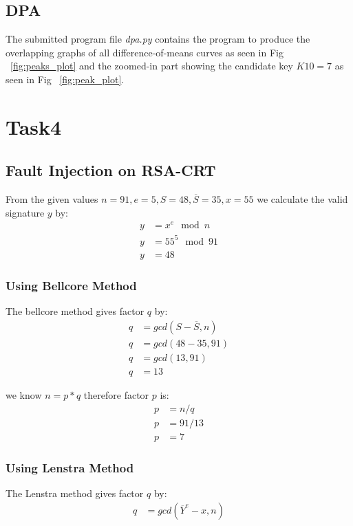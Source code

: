 \documentclass[1p,16pt]{elsarticle}
\begin{document}
\subsection{DPA}%
\label{sub:dpa}
The submitted program file \textit{dpa.py} contains the program to produce the overlapping graphs
of all difference-of-means curves as seen in Fig ~\ref{fig:peaks_plot} and the zoomed-in part
showing the candidate key $K10=7$ as seen in Fig ~\ref{fig:peak_plot}.



\section{Task4}
\label{Task4}
\subsection{Fault Injection on RSA-CRT}%
\label{sub:fault_injection_on_rsa_crt}
From the given values
$n=91, e=5, S=48, \overline{S}=35, x=55$
we calculate the valid signature $y$ by:
\begin{align}
	y &= x^e \mod n \\
	y &= 55^5 \mod 91 \\
	y & = 48
\end{align}

\subsubsection{Using Bellcore Method}%
\label{sub:ballcore_method}
The bellcore method gives factor $q$ by:
\begin{align}
	q &= gcd(S - \overline{S}, n) \\
	q &= gcd(48 - 35, 91) \\
	q &= gcd(13, 91) \\
	q &= 13
\end{align}

we know $n = p * q$ therefore factor $p$ is:
\begin{align}
	p &= n / q \\
	p &= 91 / 13 \\
	p &= 7
\end{align}


\subsubsection{Using Lenstra Method}%
\label{sub:lenstra_method}
The Lenstra method gives factor $q$ by:
\begin{align}
	q &= gcd(\overline{Y}^e - x, n) \\
\end{align}
\end{document}
